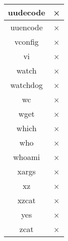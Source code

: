 \begin{longtable}{cc}
uudecode & × \\ \hline
uuencode & × \\ \hline
vconfig & × \\ \hline
vi & × \\ \hline
watch & × \\ \hline
watchdog & × \\ \hline
wc & × \\ \hline
wget & × \\ \hline
which & × \\ \hline
who & × \\ \hline
whoami & × \\ \hline
xargs & × \\ \hline
xz & × \\ \hline
xzcat & × \\ \hline
yes & × \\ \hline
zcat & × \\ \hline
\end{longtable}
















